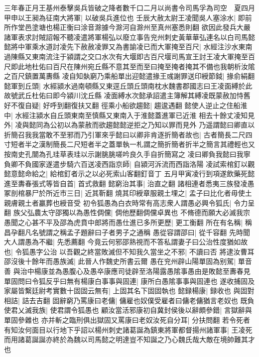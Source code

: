 三年春正月王基州泰擊吳兵皆破之降者數千口二月以尚書令司馬孚為司空　夏四月甲申以王昶為征南大將軍|{
	以破吳兵進位也}
壬辰大赦太尉王凌聞吳人塞涂水|{
	即前所作堂邑塗塘也楊正衡曰涂音滁據今滁河自滁州至真州塞悉則翻}
欲因此發兵大嚴諸軍表求討賊詔報不聽凌遣將軍楊弘以廢立事告兖州刺史黃華華弘連名以白司馬懿懿將中軍乘水道討凌先下赦赦凌罪又為書諭凌已而大軍掩至百尺|{
	水經注沙水東南過陳縣又東南流注于潁謂之交口水次有大堰即古百尺堰司馬宣王討王凌大軍掩至百尺即此地杜佑曰百尺在陳州宛丘縣不意其至而至曰掩至掩者掩其不備也我朝析汝隂之百尺鎮置萬夀縣}
凌自知埶窮乃乘船單出迎懿遣掾王彧謝罪送印綬節鉞|{
	掾俞絹翻}
懿軍到丘頭|{
	水經潁水過南頓縣又東逕丘頭丘頭南枕水魏書郡國志曰王凌面縛於此故號武丘杜佑曰即今潁川沈丘縣}
凌面縛水次懿承詔遣主簿解其縛凌既蒙赦加恃舊好不復自疑|{
	好呼到翻復扶又翻}
徑乘小船欲趨懿|{
	趨逡遇翻}
懿使人逆止之住船淮中|{
	水經注潁水自丘頭東南至慎縣又東南入于淮懿蓋進軍已近淮}
相去十餘丈凌知見外|{
	凌與懿同為公初以為蒙赦而欲趨懿懿逆拒之乃知以罪而見外}
乃遥謂懿曰卿直以折簡召我我當敢不至邪而乃引軍來乎懿曰以卿非肯逐折簡者故也|{
	古者簡長二尺四寸短者半之漢制簡長二尺短者半之蓋單執一札謂之簡折簡者折半之簡言其禮輕也又按南史孔闓為孔珪草表珪以示謝朓朓嗟吟良久手自折簡寫之}
凌曰卿負我懿曰我寧負卿不負國家遂遣步騎六百送凌西詣京師|{
	自潁河泝流而西詣洛陽}
凌試索棺釘以觀懿意懿命給之|{
	給棺釘者示之以必死索山客翻釘音丁}
五月甲寅凌行到項遂飲藥死懿進至夀春張式等皆自首|{
	首式救翻}
懿窮治其事|{
	治直之翻}
諸相連者悉夷三族發凌愚冢剖棺暴尸於所近市三日|{
	近其靳翻}
燒其印綬章服親土埋之|{
	孟子曰比化者毋使土親膚親土者臝葬也綬音受}
初令狐愚為白衣時常有高志衆人謂愚必興令狐氏|{
	令力呈翻}
族父弘農太守邵獨以為愚性倜儻|{
	倜他歷翻倜儻卓異也}
不脩德而願大必滅我宗愚聞之心甚不平及邵為虎賁中郎將而愚仕進已多所更歷|{
	更工衡翻}
所在有名稱|{
	稱昌孕翻凡名號謂之稱孟子題辭曰子者男子之通稱}
愚從容謂邵曰|{
	從千容翻}
先時聞大人謂愚為不繼|{
	先悉薦翻}
今竟云何邪邵熟視而不答私謂妻子曰公治性度猶如故也|{
	令狐愚字公治}
以吾觀之終當敗滅但不知我久當坐之不邪|{
	不讀曰否}
將逮汝曹耳邵沒後十餘年而愚族滅|{
	此晉人作魏史所書云爾}
愚在兖州辟山陽單固為别駕|{
	單音善}
與治中楊康並為愚腹心及愚卒康應司徒辟至洛陽露愚隂事愚由是敗懿至夀春見單固問曰令狐反乎曰無有楊康白事事與固連|{
	康所白愚隂事事與固連也}
遂收捕固及家屬皆繫廷尉考實數十固固云無有|{
	上固其名下固固執也}
懿録楊康|{
	録收也}
與固對相詰|{
	詰去吉翻}
固辭窮乃罵康曰老傭|{
	傭雇也奴僕受雇者曰傭老傭猶言老奴也}
既負使君乂滅我族|{
	使君謂令狐愚也}
顧汝當活邪康初自冀封侯後以辭頗參錯|{
	言獄辭與單固參雜也}
亦并斬之臨刑俱出獄固又罵康曰老奴汝死自分耳|{
	分扶問翻}
若令死者有知汝何面目以行地下乎詔以楊州刺史諸葛誕為鎮東將軍都督揚州諸軍事|{
	王凌死而用諸葛誕誕亦終於為魏以司馬懿之明達豈不知誕之乃心魏氏哉大敵在境帥難其才也}
